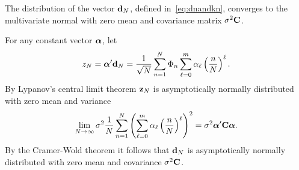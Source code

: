 \documentclass[journal]{IEEEtran}
\begin{document}
\begin{lemma}\label{eq:convdn}
The distribution of the vector $\mathbf{d}_N$, defined in~\eqref{eq:dnandkn}, converges to the multivariate normal with zero mean and covariance matrix $\sigma^2\mathbf{C}$.
\end{lemma}
\begin{IEEEproof}
For any constant vector $\boldsymbol{\alpha}$, let
\[
z_N = \boldsymbol{\alpha}^\prime \mathbf{d}_N = \frac{1}{\sqrt{N}} \sum_{n=1}^{N} \Phi_n \sum_{\ell=0}^{m}\alpha_\ell\left( \frac{n}{N} \right)^\ell.
\]
By Lypanov's central limit theorem $\mathbf{z}_N$ is asymptotically normally distributed with zero mean and variance
\[
\lim_{N\rightarrow\infty} \sigma^2 \frac{1}{N} \sum_{n=1}^{N}\left( \sum_{\ell=0}^{m}\alpha_\ell\left( \frac{n}{N} \right)^\ell \right)^2 = \sigma^2 \boldsymbol{\alpha}^\prime \mathbf{C} \boldsymbol{\alpha}.
\]
By the Cramer-Wold theorem it follows that $\mathbf{d}_N$ is asymptotically normally distributed with zero mean and covariance $\sigma^2 \mathbf{C}$. 
\end{IEEEproof}

\end{document}

